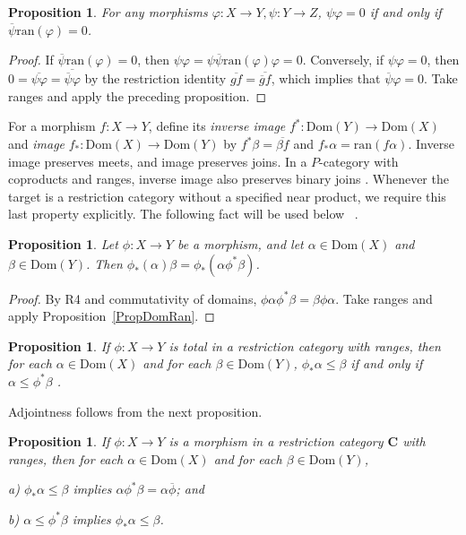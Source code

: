 \documentclass[letterpaper,10pt]{amsart}
\theoremstyle{plain}
\newtheorem{prop}[thm]{Proposition}
\theoremstyle{definition}
\newcommand{\MAP}[3]{{#1}:{#2}\rightarrow{#3}}
\newcommand{\rst}[1]{\overline{#1}}
\begin{document}
\begin{prop}\label{PropExpected}
For any morphisms $\MAP{\varphi}{X}{Y},\MAP{\psi}{Y}{Z}$,
$\psi\varphi = 0$ if and only if
$\rst{\psi}\mathrm{ran}(\varphi)=0$.
\end{prop}
\begin{proof}
If $\rst{\psi}\mathrm{ran}(\varphi)=0$, then
$\psi\varphi=\psi\rst{\psi}\mathrm{ran}(\varphi)\varphi=0$.
Conversely, if $\psi\varphi=0$, then
$0=\rst{\psi\varphi}=\rst{\rst{\psi}\varphi}$ by the restriction identity $\rst{gf}=\rst{\rst g f}$, which implies that $\rst{\psi}\varphi=0$.
Take ranges and apply the preceding proposition.
\end{proof}

For a morphism $f:X\to Y$, define its \textit{inverse image}
$f^*:\mathrm{Dom}(Y)\to\mathrm{Dom}(X)$ and \textit{image}
$f_*:\mathrm{Dom}(X)\to\mathrm{Dom}(Y)$ by
$f^*\beta=\rst{\beta f}$ and $f_*\alpha=\mathrm{ran}(f\alpha)$.
Inverse image preserves meets, and image preserves joins. In a
$P$-category with coproducts and ranges, inverse image also preserves
binary joins \cite{MR88i:03078,MR92e:03067}. Whenever the target is
a restriction category without a specified near product, we require
this last property explicitly.
The following fact will be used below ~\cite[Cor. 5.6 (iii)]{MR88i:03078}.
\begin{prop}\label{PropImageFact}
Let $\MAP{\phi}{X}{Y}$ be a morphism, and let $\alpha\in\mathrm{Dom}(X)$ and $\beta\in\mathrm{Dom}(Y)$. Then
$\phi_*(\alpha)\beta =\phi_*(\alpha\phi^*\beta)$.
\end{prop}
\begin{proof}
By R4 and commutativity of domains,
$\phi\alpha\phi^*\beta=\beta\phi\alpha$.
Take ranges and apply Proposition~\ref{PropDomRan}.
\end{proof}

\begin{prop}
If $\MAP{\phi}{X}{Y}$ is total in a restriction category with ranges, then for each
$\alpha\in\mathrm{Dom}(X)$ and for each $\beta\in\mathrm{Dom}(Y)$,
$\phi_*\alpha\le\beta$ if and only if $\alpha\le\phi^*\beta$ \cite{MR92e:03067}.
\end{prop}

Adjointness follows from the next proposition.

\begin{prop}\label{propsemiadjointness}
If $\MAP{\phi}{X}{Y}$ is a morphism in a restriction category $\mathbf{C}$ with ranges, then for each
$\alpha\in\mathrm{Dom}(X)$ and for each $\beta\in\mathrm{Dom}(Y)$,

a) $\phi_*\alpha\le\beta$ implies  $\alpha\phi^*\beta=\alpha\rst{\phi}$; and

b) $\alpha\le\phi^*\beta$ implies $\phi_*\alpha\le\beta$.
\end{prop}
\end{document}
